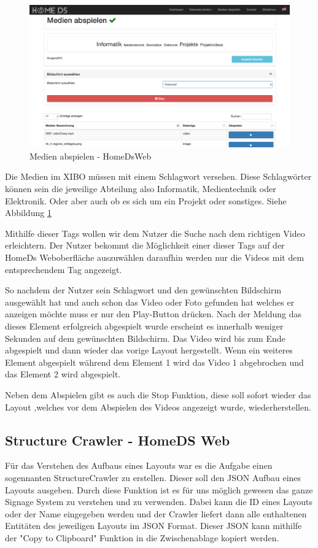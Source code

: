 \begin{figure}[h]
\centering
\includegraphics[width=1\textwidth]{images/08_HomeDsWeb/PlayMediaOverview.png}
\caption{Medien abspielen - HomeDsWeb}
\label{img:playmedia}
\end{figure}

Die Medien im XIBO müssen mit einem Schlagwort versehen. Diese Schlagwörter können sein die jeweilige Abteilung also Informatik, Medientechnik oder Elektronik. Oder aber auch ob es sich um ein Projekt oder sonstiges. Siehe Abbildung \ref{img:playmedia}

Mithilfe dieser Tags wollen wir dem Nutzer die Suche nach dem richtigen Video erleichtern. Der Nutzer bekommt die Möglichkeit einer dieser Tags auf der HomeDs Weboberfläche auszuwählen daraufhin werden nur die Videos mit dem entsprechendem Tag angezeigt.

So nachdem der Nutzer sein Schlagwort und den gewünschten Bildschirm ausgewählt hat und auch schon das Video oder Foto gefunden hat welches er anzeigen möchte muss er nur den Play-Button drücken. Nach der Meldung das dieses Element erfolgreich abgespielt wurde erscheint es innerhalb weniger Sekunden auf dem gewünschten Bildschirm. Das Video wird bis zum Ende abgespielt und dann wieder das vorige Layout hergestellt. Wenn ein weiteres Element abgespielt während dem Element 1 wird das Video 1 abgebrochen und das Element 2 wird abgespielt.

Neben dem Abspielen gibt es auch die Stop Funktion, diese soll sofort wieder das Layout ,welches vor dem Abspielen des Videos angezeigt wurde, wiederherstellen.


\subsection{Structure Crawler - HomeDS Web}\label{sec:javaeestructurecrawler}
Für das Verstehen des Aufbaus eines Layouts war es die Aufgabe einen sogennanten StructureCrawler zu erstellen. Dieser soll den JSON Aufbau eines Layouts ausgeben. Durch diese Funktion ist es für uns möglich gewesen das ganze Signage System zu verstehen und zu verwenden. Dabei kann die ID eines Layouts oder der Name eingegeben werden und der Crawler liefert dann alle enthaltenen Entitäten des jeweiligen Layouts im JSON Format. Dieser JSON kann mithilfe der "Copy to Clipboard" Funktion in die Zwischenablage kopiert werden.

